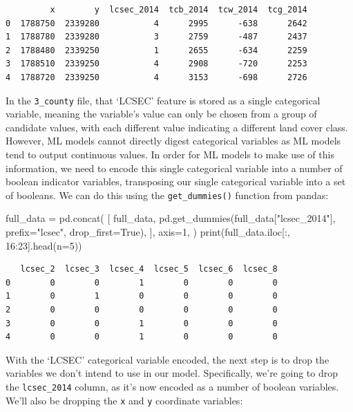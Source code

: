 \documentclass[
  letterpaper,
  DIV=11,
  numbers=noendperiod]{scrartcl}
\newenvironment{Shaded}{\begin{snugshade}}{\end{snugshade}}
\newcommand{\BuiltInTok}[1]{\textcolor[rgb]{0.00,0.23,0.31}{#1}}
\newcommand{\DecValTok}[1]{\textcolor[rgb]{0.68,0.00,0.00}{#1}}
\newcommand{\NormalTok}[1]{\textcolor[rgb]{0.00,0.23,0.31}{#1}}
\newcommand{\OperatorTok}[1]{\textcolor[rgb]{0.37,0.37,0.37}{#1}}
\newcommand{\StringTok}[1]{\textcolor[rgb]{0.13,0.47,0.30}{#1}}
\newcommand{\VariableTok}[1]{\textcolor[rgb]{0.07,0.07,0.07}{#1}}
\begin{document}
\begin{verbatim}
         x        y  lcsec_2014  tcb_2014  tcw_2014  tcg_2014
0  1788750  2339280           4      2995      -638      2642
1  1788780  2339280           3      2759      -487      2437
2  1788480  2339250           1      2655      -634      2259
3  1788510  2339250           4      2908      -720      2253
4  1788720  2339250           4      3153      -698      2726
\end{verbatim}

In the \texttt{3\_county} file, that `LCSEC' feature is stored as a
single categorical variable, meaning the variable's value can only be
chosen from a group of candidate values, with each different value
indicating a different land cover class. However, ML models cannot
directly digest categorical variables as ML models tend to output
continuous values. In order for ML models to make use of this
information, we need to encode this single categorical variable into a
number of boolean indicator variables, transposing our single
categorical variable into a set of booleans. We can do this using the
\texttt{get\_dummies()} function from pandas:

\begin{Shaded}
\begin{Highlighting}[]
\NormalTok{full\_data }\OperatorTok{=}\NormalTok{ pd.concat(}
\NormalTok{    [}
\NormalTok{        full\_data,}
\NormalTok{        pd.get\_dummies(full\_data[}\StringTok{"lcsec\_2014"}\NormalTok{], prefix}\OperatorTok{=}\StringTok{"lcsec"}\NormalTok{, drop\_first}\OperatorTok{=}\VariableTok{True}\NormalTok{),}
\NormalTok{    ],}
\NormalTok{    axis}\OperatorTok{=}\DecValTok{1}\NormalTok{,}
\NormalTok{)}
\BuiltInTok{print}\NormalTok{(full\_data.iloc[:, }\DecValTok{16}\NormalTok{:}\DecValTok{23}\NormalTok{].head(n}\OperatorTok{=}\DecValTok{5}\NormalTok{))}
\end{Highlighting}
\end{Shaded}

\begin{verbatim}
   lcsec_2  lcsec_3  lcsec_4  lcsec_5  lcsec_6  lcsec_8
0        0        0        1        0        0        0
1        0        1        0        0        0        0
2        0        0        0        0        0        0
3        0        0        1        0        0        0
4        0        0        1        0        0        0
\end{verbatim}

With the `LCSEC' categorical variable encoded, the next step is to drop
the variables we don't intend to use in our model. Specifically, we're
going to drop the \texttt{lcsec\_2014} column, as it's now encoded as a
number of boolean variables. We'll also be dropping the \texttt{x} and
\texttt{y} coordinate variables:
\end{document}
